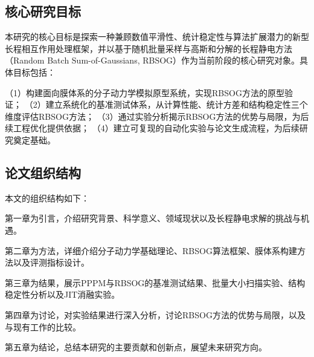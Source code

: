\subsection{核心研究目标}

本研究的核心目标是探索一种兼顾数值平滑性、统计稳定性与算法扩展潜力的新型长程相互作用处理框架，并以基于随机批量采样与高斯和分解的长程静电方法（Random Batch Sum-of-Gaussians, RBSOG）作为当前阶段的核心研究对象。具体目标包括：

（1）构建面向膜体系的分子动力学模拟原型系统，实现RBSOG方法的原型验证；
（2）建立系统化的基准测试体系，从计算性能、统计方差和结构稳定性三个维度评估RBSOG方法；
（3）通过实验分析揭示RBSOG方法的优势与局限，为后续工程优化提供依据；
（4）建立可复现的自动化实验与论文生成流程，为后续研究奠定基础。

\subsection{论文组织结构}

本文的组织结构如下：

第一章为引言，介绍研究背景、科学意义、领域现状以及长程静电求解的挑战与机遇。

第二章为方法，详细介绍分子动力学基础理论、RBSOG算法框架、膜体系构建方法以及评测指标设计。

第三章为结果，展示PPPM与RBSOG的基准测试结果、批量大小扫描实验、结构稳定性分析以及JIT消融实验。

第四章为讨论，对实验结果进行深入分析，讨论RBSOG方法的优势与局限，以及与现有工作的比较。

第五章为结论，总结本研究的主要贡献和创新点，展望未来研究方向。
